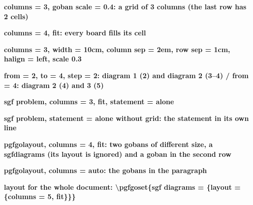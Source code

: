 \documentclass{article}
\newcommand\case[1]{\par\medskip\noindent\textbf{#1}\par\nopagebreak}
\begin{document}

\case{columns = 3, goban scale = 0.4: a grid of 3 columns (the last row has 2 cells)}

\case{columns = 4, fit: every board fills its cell}

\case{columns = 3, width = 10cm, column sep = 2em, row sep = 1cm, halign = left, scale 0.3}

\case{from = 2, to = 4, step = 2: diagram 1 (2) and diagram 2 (3--4) / from = 4: diagram 2 (4) and 3 (5)}


\newpage
\case{sgf problem, columns = 3, fit, statement = alone}

\case{sgf problem, statement = alone without grid: the statement in its own line}

\case{pgfgolayout, columns = 4, fit: two gobans of different size, a sgfdiagrams (its layout is ignored) and a goban in the second row}
\begin{pgfgolayout}[columns = 4, fit]
	\begin{goban}[5]
	\end{goban}
	\begin{goban}[9, partial = A1:E5]
	\end{goban}
	\begin{goban}[7]
	\end{goban}
\end{pgfgolayout}

\case{pgfgolayout, columns = auto: the gobans in the paragraph}
\begin{pgfgolayout}
	\begin{goban}[5, scale = 0.5]\end{goban}
	\begin{goban}[5, scale = 0.5]\end{goban}
\end{pgfgolayout}

\case{layout for the whole document: \textbackslash pgfgoset\{sgf diagrams = \{layout = \{columns = 5, fit\}\}\}}
{
}
\end{document}
